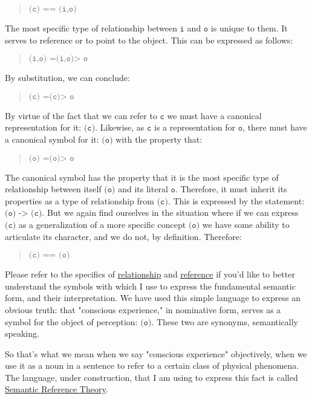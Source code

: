 \documentclass[runningheads]{llncs}
\newcommand{\lib}[2]{\href{https://dna-platform.github.io/inexplicable-phenomena#1}{#2}\xspace}
\begin{document}
\begin{quote}
$\texttt{(c) == (i,o)}$
\end{quote}

The most specific type of relationship between $\texttt{i}$ and $\texttt{o}$ is unique to them. It serves to reference or to point to the object. This can be expressed as follows:

\begin{quote}
$\texttt{(i,o) =(i,o)> o}$
\end{quote}

By substitution, we can conclude:

\begin{quote}
$\texttt{(c) =(c)> o}$
\end{quote}

By virtue of the fact that we can refer to $\texttt{c}$ we must have a canonical representation for it: $\texttt{(c)}$. Likewise, as $\texttt{c}$ is a representation for $\texttt{o}$, there must have a canonical symbol for it: $\texttt{(o)}$ with the property that:

\begin{quote}
$\texttt{(o) =(o)> o}$
\end{quote}

The canonical symbol has the property that it is the most specific type of relationship between itself $\texttt{(o)}$ and its literal $\texttt{o}$. Therefore, it must inherit its properties as a type of relationship from $\texttt{(c)}$. This is expressed by the statement: $\texttt{(o) -> (c)}$. But we again find ourselves in the situation where if we can express $\texttt{(c)}$ as a generalization of a more specific concept $\texttt{(o)}$ we have some ability to articulate its character, and we do not, by definition. Therefore:

\begin{quote}
$\texttt{(c) == (o)}$
\end{quote}

Please refer to the specifics of \lib{/encyclopedia/relationship.html}{relationship} and \lib{/encyclopedia/reference.html}{reference} if you'd like to better understand the symbols with which I use to express the fundamental semantic form, and their interpretation. We have used this simple language to express an obvious truth: that "conscious experience," in nominative form, serves as a symbol for the object of perception: $\texttt{(o)}$. These two are synonyms, semantically speaking.

So that's what we mean when we say "conscious experience" objectively, when we use it as a noun in a sentence to refer to a certain class of physical phenomena. The language, under construction, that I am using to express this fact is called \lib{/encyclopedia/semantic-reference-theory.html}{Semantic Reference Theory}.
\end{document}
